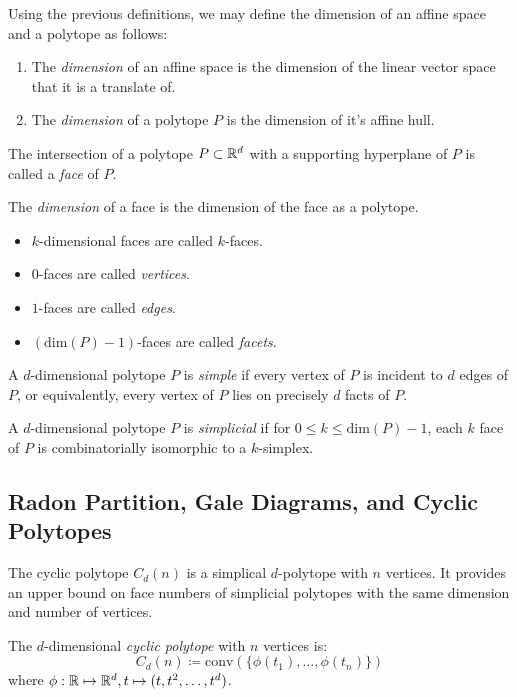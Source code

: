 \begin{definition}[Dimension]
    Using the previous definitions, we may define the dimension of an affine space and a polytope as follows:
    \begin{enumerate}
        \item The \textit{dimension} of an affine space is the dimension of the linear vector space that it is a translate of.
        \item The \textit{dimension} of a polytope $P$ is the dimension of it's affine hull.
    \end{enumerate}
\end{definition}

\begin{definition}
    The intersection of a polytope $P \subset \mathbb{R}^d$ with a supporting hyperplane of $P$ is called a \textit{face} of $P$.

    The \textit{dimension} of a face is the dimension of the face as a polytope.
    \begin{itemize}
        \item $k$-dimensional faces are called $k$-faces.
        \item $0$-faces are called \textit{vertices}.
        \item $1$-faces are called \textit{edges}.
        \item $(\text{dim}(P) - 1)$-faces are called \textit{facets}.
    \end{itemize}
\end{definition}

\begin{definition}
    A $d$-dimensional polytope $P$ is \textit{simple} if every vertex of $P$ is incident to $d$ edges of $P$, or equivalently, every vertex of $P$ lies on precisely $d$ facts of $P$.

    A $d$-dimensional polytope $P$ is \textit{simplicial} if for $0 \leq k \leq \text{dim}(P) - 1$, each $k$ face of $P$ is combinatorially isomorphic to a $k$-simplex.
\end{definition}

\subsection{Radon Partition, Gale Diagrams, and Cyclic Polytopes}

The cyclic polytope $C_d(n)$ is a simplical $d$-polytope with $n$ vertices.
It provides an upper bound on face numbers of simplicial polytopes with the same dimension and number of vertices.
\begin{definition}
    The $d$-dimensional \textit{cyclic polytope} with $n$ vertices is:
    $$C_d(n) \coloneqq \text{conv}(\{\phi(t_1), \dots,  \phi(t_n)\})$$
    where $\phi : \mathbb{R} \mapsto \mathbb{R}^d, t \mapsto (t, t^2, \dots, t^d)$.
\end{definition}

